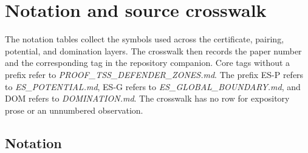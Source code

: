 \section{Notation and source crosswalk}
\label{sec:notation}
\label{sec:appendix}

The notation tables collect the symbols used across the certificate,
pairing, potential, and domination layers.  The crosswalk then records the
paper number and the corresponding tag in the repository companion.  Core
tags without a prefix refer to \emph{PROOF\_TSS\_DEFENDER\_ZONES.md}.
The prefix ES-P refers to \emph{ES\_POTENTIAL.md}, ES-G refers to
\emph{ES\_GLOBAL\_BOUNDARY.md}, and DOM refers to
\emph{DOMINATION.md}.  The crosswalk has no row for expository prose or an
unnumbered observation.

\subsection{Notation}

\newenvironment{appendixtable}
  {\par\medskip\noindent\begin{minipage}{\textwidth}\centering
   \captionsetup{hypcap=false}}
  {\end{minipage}\par\medskip}

